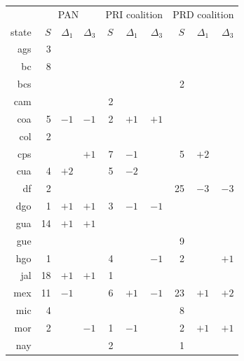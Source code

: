 \documentclass[letter,12pt]{article}
\begin{document}
\begin{table}
\begin{center}
 \begin{tabular}{rrrr|rrr|rrr}
      & \multicolumn{3}{c}{PAN} & \multicolumn{3}{c}{PRI coalition} & \multicolumn{3}{c}{PRD coalition} \\
state &$S$& $\Delta_1$ &  $\Delta_3$ & $S$& $\Delta_1$ &  $\Delta_3$ & $S$& $\Delta_1$ &  $\Delta_3$  \\ \hline
ags &   3 &     &     &      &      &      &      &      &        \\       
 bc &   8 &     &     &      &      &      &      &      &        \\       
bcs &     &     &     &      &      &      &    2 &      &        \\       
cam &     &     &     &    2 &      &      &      &      &        \\       \hdashline
coa &   5 & $-1$& $-1$&    2 &  $+1$&  $+1$&      &      &        \\       
col &   2 &     &     &      &      &      &      &      &        \\       
cps &     &     & $+1$&    7 &  $-1$&      &    5 &  $+2$&        \\       
cua &   4 & $+2$&     &    5 &  $-2$&      &      &      &        \\       \hdashline
 df &   2 &     &     &      &      &      &   25 &  $-3$&  $-3$  \\       
dgo &   1 & $+1$& $+1$&    3 &  $-1$&  $-1$&      &      &        \\       
gua &  14 & $+1$& $+1$&      &      &      &      &      &        \\       
gue &     &     &     &      &      &      &    9 &      &        \\       \hdashline
hgo &   1 &     &     &    4 &      &  $-1$&    2 &      &  $+1$  \\       
jal &  18 & $+1$& $+1$&    1 &      &      &      &      &        \\       
mex &  11 & $-1$&     &    6 &  $+1$&  $-1$&   23 &  $+1$&  $+2$  \\       
mic &   4 &     &     &      &      &      &    8 &      &        \\       \hdashline
mor &   2 &     & $-1$&    1 &  $-1$&      &    2 &  $+1$&  $+1$  \\       
nay &     &     &     &    2 &      &      &    1 &      &        \\       

\end{tabular}
\end{center}
\end{table}
\end{document}
